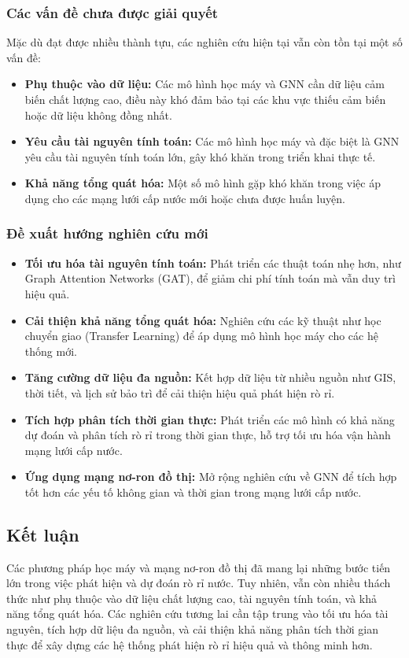 \subsubsection{Các vấn đề chưa được giải quyết}
Mặc dù đạt được nhiều thành tựu, các nghiên cứu hiện tại vẫn còn tồn tại một số vấn đề:
\begin{itemize}
    \item \textbf{Phụ thuộc vào dữ liệu:} Các mô hình học máy và GNN cần dữ liệu cảm biến chất lượng cao, điều này khó đảm bảo tại các khu vực thiếu cảm biến hoặc dữ liệu không đồng nhất.
    \item \textbf{Yêu cầu tài nguyên tính toán:} Các mô hình học máy và đặc biệt là GNN yêu cầu tài nguyên tính toán lớn, gây khó khăn trong triển khai thực tế.
    \item \textbf{Khả năng tổng quát hóa:} Một số mô hình gặp khó khăn trong việc áp dụng cho các mạng lưới cấp nước mới hoặc chưa được huấn luyện.
\end{itemize}

\subsubsection{Đề xuất hướng nghiên cứu mới}
\begin{itemize}
    \item \textbf{Tối ưu hóa tài nguyên tính toán:} Phát triển các thuật toán nhẹ hơn, như Graph Attention Networks (GAT), để giảm chi phí tính toán mà vẫn duy trì hiệu quả.
    \item \textbf{Cải thiện khả năng tổng quát hóa:} Nghiên cứu các kỹ thuật như học chuyển giao (Transfer Learning) để áp dụng mô hình học máy cho các hệ thống mới.
    \item \textbf{Tăng cường dữ liệu đa nguồn:} Kết hợp dữ liệu từ nhiều nguồn như GIS, thời tiết, và lịch sử bảo trì để cải thiện hiệu quả phát hiện rò rỉ.
    \item \textbf{Tích hợp phân tích thời gian thực:} Phát triển các mô hình có khả năng dự đoán và phân tích rò rỉ trong thời gian thực, hỗ trợ tối ưu hóa vận hành mạng lưới cấp nước.
    \item \textbf{Ứng dụng mạng nơ-ron đồ thị:} Mở rộng nghiên cứu về GNN để tích hợp tốt hơn các yếu tố không gian và thời gian trong mạng lưới cấp nước.
\end{itemize}

\subsection{Kết luận}
Các phương pháp học máy và mạng nơ-ron đồ thị đã mang lại những bước tiến lớn trong việc phát hiện và dự đoán rò rỉ nước. Tuy nhiên, vẫn còn nhiều thách thức như phụ thuộc vào dữ liệu chất lượng cao, tài nguyên tính toán, và khả năng tổng quát hóa. Các nghiên cứu tương lai cần tập trung vào tối ưu hóa tài nguyên, tích hợp dữ liệu đa nguồn, và cải thiện khả năng phân tích thời gian thực để xây dựng các hệ thống phát hiện rò rỉ hiệu quả và thông minh hơn.
